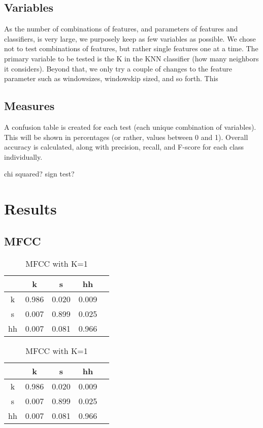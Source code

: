 	\subsection{Variables}
		As the number of combinations of features, and parameters of features and classifiers, is very large, we purposely keep as few variables as possible. We chose not to test combinations of features, but rather single features one at a time.
		The primary variable to be tested is the K in the KNN classifier (how many neighbors it considers). Beyond that, we only try a couple of changes to the feature parameter such as windowsizes, windowskip sized, and so forth. This 

	\subsection{Measures}
		A confusion table is created for each test (each unique combination of variables). This will be shown in percentages (or rather, values between 0 and 1). Overall accuracy is calculated, along with precision, recall, and F-score for each class individually.

		chi squared?
		sign test?

 
\section{Results}

	\subsection{MFCC}

		\begin{table}
			\begin{subtable}[h]{0.45\textwidth}
				\centering
				\begin{tabular}{|c | c | c | c | c |}
					\hline
					   & k & s & hh\\ \hline
					k  & 0.986 & 0.020 & 0.009\\ \hline
					s  & 0.007 & 0.899 & 0.025\\ \hline
					hh & 0.007 & 0.081 & 0.966\\ \hline
				\end{tabular}
				\caption{$K=1$}
				\label{table:mfcc:k1}
			\end{subtable}
			\hfill
			\begin{subtable}[h]{0.45\textwidth}
				\centering
				\begin{tabular}{|c | c | c | c | c |}
					\hline
					   & k & s & hh\\ \hline
					k  & 0.986 & 0.020 & 0.009\\ \hline
					s  & 0.007 & 0.899 & 0.025\\ \hline
					hh & 0.007 & 0.081 & 0.966\\ \hline
				\end{tabular}
				\caption{$K=1$}
				\label{table:mfcc:k1}
			\end{subtable}
			\caption{MFCC with K=1}
			\label{mfcck1}
		\end{table}